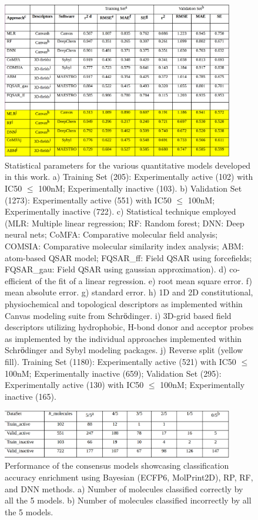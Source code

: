 \begin{figure}
  \centering
  \includegraphics[width=0.9\textwidth]{Images/bace_table_2.png}
  \caption{Statistical parameters for the various quantitative models developed in this work. a) Training Set (205):  Experimentally active (102) with IC50 $\leq$ 100nM; Experimentally inactive (103). b) Validation Set (1273):  Experimentally active (551) with IC50 $\leq$  100nM; Experimentally inactive (722). c) Statistical technique employed (MLR:  Multiple linear regression; RF:  Random forest; DNN: Deep neural nets; CoMFA:  Comparative molecular field analysis; COMSIA:  Comparative molecular similarity index analysis; ABM:  atom-based QSAR model; FQSAR\_ff:  Field QSAR using forcefields; FQSAR\_gau:  Field QSAR using gaussian approximation). d) co-efficient of the fit of a linear regression. e) root mean square error. f) mean absolute error. g) standard error. h) 1D and 2D constitutional, physiochemical and topological descriptors as implemented within Canvas modeling suite from Schrӧdinger. i) 3D-grid based field descriptors utilizing hydrophobic, H-bond donor and acceptor probes as implemented by the individual approaches implemented within Schrӧdinger and Sybyl modeling packages. j) Reverse split (yellow fill).  Training Set (1180):  Experimentally active (521) with IC50 $\leq$ 100nM; Experimentally inactive (659); Validation Set (295):  Experimentally active (130) with IC50 $\leq$ 100nM; Experimentally inactive (165).}
  \label{fig:bace_table2}
\end{figure}


\begin{figure}
  \centering
  \includegraphics[width=0.9\textwidth]{Images/bace_table_3.png}
  \caption{Performance of the consensus models showcasing classification accuracy enrichment using Bayesian (ECFP6, MolPrint2D), RP, RF, and DNN methods. a) Number of molecules classified correctly by all the 5 models. b) Number of molecules classified incorrectly by all the 5 models.}
  \label{fig:bace_table3}
\end{figure}

